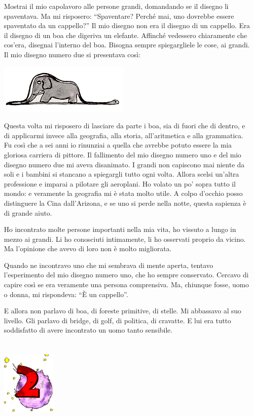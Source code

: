 \documentclass[11pt]{scrbook}
\begin{document}
Mostrai il mio capolavoro alle persone grandi, domandando se il disegno li spaventava. Ma mi risposero: ``Spaventare? Perché mai, uno dovrebbe essere spaventato da un cappello?'' Il mio disegno non era il disegno di un cappello. Era il disegno di un boa che digeriva un elefante. Affinché  vedessero chiaramente che cos'era, disegnai l'interno del boa. Bisogna sempre spiegargliele le cose, ai grandi. Il mio disegno numero due si presentava così:

\begin{center}
\includegraphics{img/boa}
\end{center}

Questa volta mi risposero di lasciare da parte i boa, sia di fuori che di dentro, e di applicarmi invece alla geografia, alla storia, all'aritmetica e alla grammatica. Fu così che a sei anni io rinunziai a quella che avrebbe potuto essere la mia gloriosa carriera di pittore. Il fallimento del mio disegno numero uno e del mio disegno numero due mi aveva disanimato. I grandi non capiscono mai niente da soli e i bambini si stancano a spiegargli tutto ogni volta. Allora scelsi un'altra professione e imparai a pilotare gli aeroplani. Ho volato un po' sopra tutto il mondo: e veramente la geografia mi è stata molto utile. A colpo d'occhio posso distinguere la Cina dall'Arizona, e se uno si perde nella notte, questa sapienza è di grande aiuto.

Ho incontrato molte persone importanti nella mia vita, ho vissuto a lungo in mezzo ai grandi. Li ho conosciuti intimamente, li ho osservati proprio da vicino. Ma l'opinione che avevo di loro non è molto migliorata.

Quando ne incontravo uno che mi sembrava di mente aperta, tentavo l'esperimento del mio disegno numero uno, che ho sempre conservato. Cercavo di capire così se era veramente una persona comprensiva. Ma, chiunque fosse, uomo o donna, mi rispondeva: ``È un cappello''.

E allora non parlavo di boa, di foreste primitive, di stelle. Mi abbassavo al suo livello. Gli parlavo di bridge, di golf, di politica, di cravatte. E lui era tutto soddisfatto di avere incontrato un uomo tanto sensibile.

\chapter{}
\begin{center}
\includegraphics{img/chapter2}
\end{center}
\end{document}
